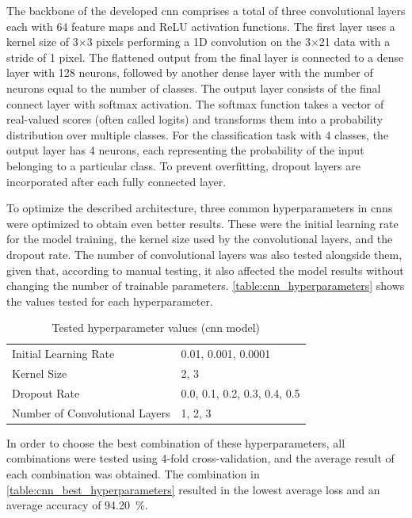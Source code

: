 The backbone of the developed \acs{cnn} comprises a total of three convolutional layers each with 64 feature maps and ReLU activation functions. 
The first layer uses a kernel size of 3$\times$3 pixels performing a 1D convolution on the 3$\times$21 data with a stride of 1 pixel. The flattened output from the final layer is connected to a dense layer with 128 neurons, followed by another dense layer with the number of neurons equal to the number of classes. The output layer consists of the final connect layer with softmax activation. The softmax function takes a vector of real-valued scores (often called logits) and transforms them into a probability distribution over multiple classes. For the classification task with 4 classes, the output layer has 4 neurons, each representing the probability of the input belonging to a particular class. To prevent overfitting, dropout layers are incorporated after each fully connected layer.

To optimize the described architecture, three common hyperparameters in \acs{cnn}s were optimized to obtain even better results. These were the initial learning rate for the model training, the kernel size used by the convolutional layers, and the dropout rate. The number of convolutional layers was also tested alongside them, given that, according to manual testing, it also affected the model results without changing the number of trainable parameters. \autoref{table:cnn_hyperparameters} shows the values tested for each hyperparameter.

\begin{table}[ht]
    \centering
    \caption{Tested hyperparameter values (\acs{cnn} model)}
    \label{table:cnn_hyperparameters}
    \begin{tabular}{ll}
        \toprule
        Initial Learning Rate & 0.01, 0.001, 0.0001 \\
        Kernel Size & 2, 3 \\
        Dropout Rate & 0.0, 0.1, 0.2, 0.3, 0.4, 0.5 \\
        Number of Convolutional Layers & 1, 2, 3 \\
        \bottomrule
    \end{tabular}
\end{table}

In order to choose the best combination of these hyperparameters, all combinations were tested using 4-fold cross-validation, and the average result of each combination was obtained. The combination in \autoref{table:cnn_best_hyperparameters} resulted in the lowest average loss and an average accuracy of \SI{94.20}{\percent}.

